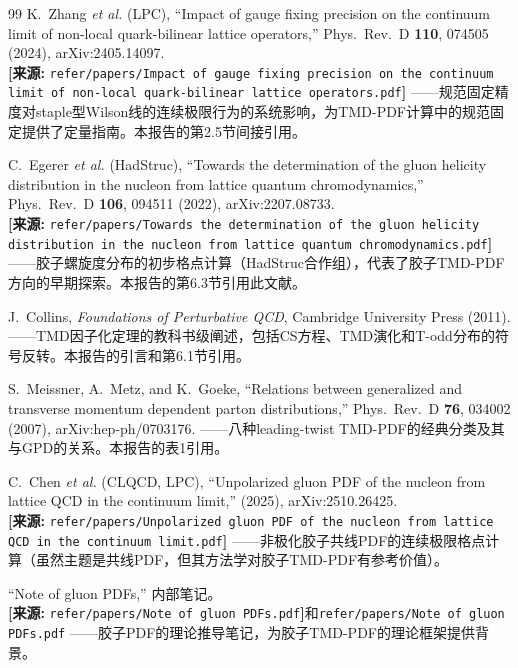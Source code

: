 \documentclass[12pt,a4paper]{ctexart}
\theoremstyle{definition}
\begin{document}
\begin{thebibliography}{99}
K.~Zhang \textit{et al.} (LPC),
``Impact of gauge fixing precision on the continuum limit of non-local quark-bilinear lattice operators,''
Phys.\ Rev.\ D \textbf{110}, 074505 (2024), arXiv:2405.14097.
\\\textbf{[来源:} \texttt{refer/papers/Impact of gauge fixing precision on the continuum limit of non-local quark-bilinear lattice operators.pdf}\textbf{]}
——规范固定精度对staple型Wilson线的连续极限行为的系统影响，为TMD-PDF计算中的规范固定提供了定量指南。本报告的第2.5节间接引用。

C.~Egerer \textit{et al.} (HadStruc),
``Towards the determination of the gluon helicity distribution in the nucleon from lattice quantum chromodynamics,''
Phys.\ Rev.\ D \textbf{106}, 094511 (2022), arXiv:2207.08733.
\\\textbf{[来源:} \texttt{refer/papers/Towards the determination of the gluon helicity distribution in the nucleon from lattice quantum chromodynamics.pdf}\textbf{]}
——胶子螺旋度分布的初步格点计算（HadStruc合作组），代表了胶子TMD-PDF方向的早期探索。本报告的第6.3节引用此文献。

J.~Collins,
\textit{Foundations of Perturbative QCD},
Cambridge University Press (2011).
——TMD因子化定理的教科书级阐述，包括CS方程、TMD演化和T-odd分布的符号反转。本报告的引言和第6.1节引用。

S.~Meissner, A.~Metz, and K.~Goeke,
``Relations between generalized and transverse momentum dependent parton distributions,''
Phys.\ Rev.\ D \textbf{76}, 034002 (2007), arXiv:hep-ph/0703176.
——八种leading-twist TMD-PDF的经典分类及其与GPD的关系。本报告的表1引用。

C.~Chen \textit{et al.} (CLQCD, LPC),
``Unpolarized gluon PDF of the nucleon from lattice QCD in the continuum limit,''
(2025), arXiv:2510.26425.
\\\textbf{[来源:} \texttt{refer/papers/Unpolarized gluon PDF of the nucleon from lattice QCD in the continuum limit.pdf}\textbf{]}
——非极化胶子共线PDF的连续极限格点计算（虽然主题是共线PDF，但其方法学对胶子TMD-PDF有参考价值）。

``Note of gluon PDFs,'' 内部笔记。
\\\textbf{[来源:} \texttt{refer/papers/Note of gluon PDFs.pdf}\textbf{]}和\texttt{refer/papers/Note of gluon PDFs.pdf}
——胶子PDF的理论推导笔记，为胶子TMD-PDF的理论框架提供背景。

\end{thebibliography}
\end{document}
